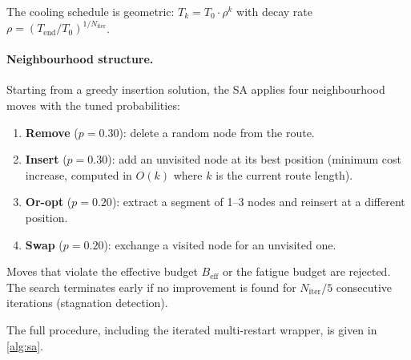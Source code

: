 \documentclass[11pt,a4paper]{article}
\begin{document}
The cooling schedule is geometric: $T_k = T_0 \cdot \rho^k$ with decay rate $\rho = (T_{\text{end}}/T_0)^{1/N_{\text{iter}}}$.

\paragraph{Neighbourhood structure.}
Starting from a greedy insertion solution, the SA applies four neighbourhood moves with the tuned probabilities:
\begin{enumerate}[nosep]
  \item \textbf{Remove} ($p = 0.30$): delete a random node from the route.
  \item \textbf{Insert} ($p = 0.30$): add an unvisited node at its best position (minimum cost increase, computed in $O(k)$ where $k$ is the current route length).
  \item \textbf{Or-opt} ($p = 0.20$): extract a segment of 1--3 nodes and reinsert at a different position.
  \item \textbf{Swap} ($p = 0.20$): exchange a visited node for an unvisited one.
\end{enumerate}

Moves that violate the effective budget $B_{\text{eff}}$ or the fatigue budget are rejected.
The search terminates early if no improvement is found for $N_{\text{iter}}/5$ consecutive iterations (stagnation detection).

The full procedure, including the iterated multi-restart wrapper, is given in \cref{alg:sa}.
\end{document}
